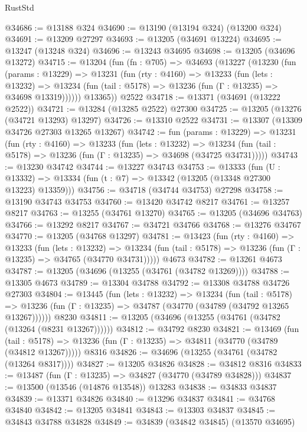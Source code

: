 \begin{lexlean}{RustStd}
\begin{coremodule}
@34686 := @13188 @324
@34690 := @13190 (@13194 @324) (@13200 @324)
@34691 := @13209 @27297
@34693 := @13205 (@34691 @13224)
@34695 := @13247 (@13248 @324)
@34696 := @13243 @34695
@34698 := @13205 (@34696 @13272)
@34715 := @13204
    (fun (fn : @705) =>
    @34693
      (@13227
        (@13230
          (fun (params : @13229) =>
          @13231
            (fun (rty : @4160) =>
            @13233
              (fun (lets : @13232) =>
              @13234 (fun (tail : @5178) => @13236 (fun (Γ : @13235) => @34698 @13319))))))
        @13365))
    @2522
@34718 := @13371 (@34691 (@13222 @2522))
@34721 := @13284 (@13285 @2522) @27300
@34725 := @13205 (@13276 (@34721 @13293) @13297)
@34726 := @13310 @2522
@34731 := @13307 (@13309 @34726 @27303 @13265 @13267)
@34742 := fun (params : @13229) =>
  @13231
    (fun (rty : @4160) =>
    @13233
      (fun (lets : @13232) =>
      @13234 (fun (tail : @5178) => @13236 (fun (Γ : @13235) => @34698 (@34725 @34731)))))
@34743 := @13230 @34742
@34744 := @13227 @34743
@34753 := @13333
    (fun (U : @13332) => @13334 (fun (t : @7) => @13342 (@13205 (@13348 @27300 @13223) @13359)))
@34756 := @34718 (@34744 @34753) @27298
@34758 := @13190 @34743 @34753
@34760 := @13420 @34742 @8217
@34761 := @13257 @8217
@34763 := @13255 (@34761 @13270)
@34765 := @13205 (@34696 @34763)
@34766 := @13292 @8217
@34767 := @34721 @34766
@34768 := @13276 @34767
@34770 := @13205 (@34768 @13297)
@34781 := @13423
    (fun (rty : @4160) =>
    @13233
      (fun (lets : @13232) =>
      @13234 (fun (tail : @5178) => @13236 (fun (Γ : @13235) => @34765 (@34770 @34731)))))
    @4673
@34782 := @13261 @4673
@34787 := @13205 (@34696 (@13255 (@34761 (@34782 @13269))))
@34788 := @13305 @4673
@34789 := @13304 @34788
@34792 := @13308 @34788 @34726 @27303
@34804 := @13445
    (fun (lets : @13232) =>
    @13234
      (fun (tail : @5178) =>
      @13236 (fun (Γ : @13235) => @34787 (@34770 (@34789 (@34792 @13265 @13267))))))
    @8230
@34811 := @13205 (@34696 (@13255 (@34761 (@34782 (@13264 (@8231 @13267))))))
@34812 := @34792 @8230
@34821 := @13469
    (fun (tail : @5178) => @13236 (fun (Γ : @13235) => @34811 (@34770 (@34789 (@34812 @13267)))))
    @8316
@34826 := @34696 (@13255 (@34761 (@34782 (@13264 @8317))))
@34827 := @13205 @34826
@34828 := @34812 @8316
@34833 := @13487 (fun (Γ : @13235) => @34827 (@34770 (@34789 @34828)))
@34837 := @13500 (@13546 (@14876 @13548)) @13283
@34838 := @34833 @34837
@34839 := @13371 @34826
@34840 := @13296 @34837
@34841 := @34768 @34840
@34842 := @13205 @34841
@34843 := @13303 @34837
@34845 := @34843 @34788 @34828
@34849 := @34839 (@34842 @34845) (@13570 @34695)

\end{coremodule}
\end{lexlean}
